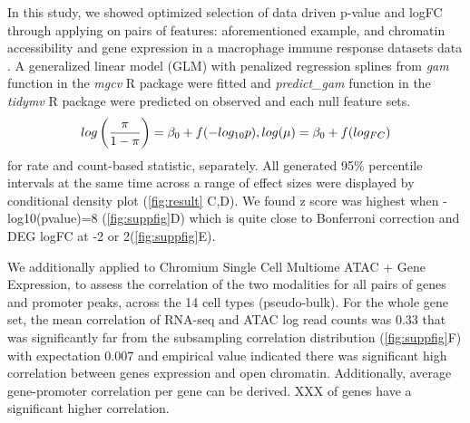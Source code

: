 In this study, we showed optimized selection of data driven p-value and logFC through applying \bootranges on pairs of features: 
aforementioned example, and chromatin accessibility and gene expression in a macrophage immune response datasets data \citep{alasoo2018shared}. A generalized linear model (GLM) with penalized regression splines from \textit{gam} function in the \emph{mgcv} R package were fitted and \textit{predict\_gam} function in the \emph{tidymv} R package were predicted on observed and each null feature sets. 
$$
\setlength{\abovedisplayskip}{3pt}
\setlength{\belowdisplayskip}{3pt}
log \left( \frac{\pi}{1-\pi} \right) = \beta_0  + f (-log_{10}p), log(\mu) = \beta_0 + f (log_{FC})
$$ 
for rate and count-based statistic, separately. 
All generated 95\% percentile intervals at the same time across a range of effect sizes were displayed by conditional density plot (\cref{fig:result} C,D). We found z score was highest when -log10(pvalue)=8 (\cref{fig:suppfig}D) which is quite close to Bonferroni correction and DEG logFC at -2 or 2(\cref{fig:suppfig}E). 

We additionally applied
\bootranges to Chromium Single Cell Multiome ATAC + Gene Expression, to assess the correlation of the two modalities for all pairs of genes and promoter peaks, across the 14 cell types (pseudo-bulk).
For the whole gene set, the mean correlation of RNA-seq and ATAC log read counts was 0.33 that was significantly far from the subsampling correlation distribution (\cref{fig:suppfig}F) with expectation 0.007 and empirical value indicated there was significant high correlation between genes expression and open chromatin. Additionally, average gene-promoter correlation per gene can be derived. XXX of genes have a significant higher correlation. 


